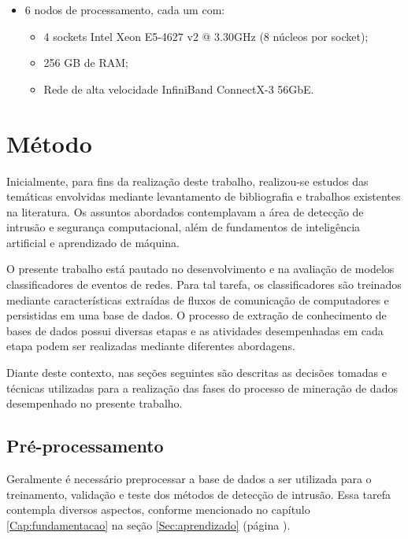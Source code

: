 \begin{itemize}
    \item 6 nodos de processamento, cada um com:
    \begin{itemize}
        \item 4 sockets Intel Xeon E5-4627 v2 @ 3.30GHz (8 núcleos por socket);
        \item 256 GB de RAM;
        \item Rede de alta velocidade InfiniBand ConnectX-3 56GbE.
    \end{itemize}
\end{itemize}

\section{Método}

Inicialmente, para fins da realização deste trabalho, realizou-se estudos das temáticas envolvidas mediante levantamento de bibliografia e trabalhos existentes na literatura. Os assuntos abordados contemplavam a área de detecção de intrusão e segurança computacional, além de fundamentos de inteligência artificial e aprendizado de máquina.

O presente trabalho está pautado no desenvolvimento e na avaliação de modelos classificadores de eventos de redes. Para tal tarefa, os classificadores são treinados mediante características extraídas de fluxos de comunicação de computadores e persistidas em uma base de dados. O processo de extração de conhecimento de bases de dados possui diversas etapas e as atividades desempenhadas em cada etapa podem ser realizadas mediante diferentes abordagens.

Diante deste contexto, nas seções seguintes são descritas as decisões tomadas e técnicas utilizadas para a realização das fases do processo de mineração de dados desempenhado no presente trabalho.




\subsection{Pré-processamento}
\label{subsec:pre-processamento}

Geralmente é necessário preprocessar a base de dados a ser utilizada para o treinamento, validação e teste dos métodos de detecção de intrusão. Essa tarefa contempla diversos aspectos, conforme mencionado no capítulo \ref{Cap:fundamentacao} na seção \ref{Sec:aprendizado} (página \pageref{Sec:aprendizado}).


